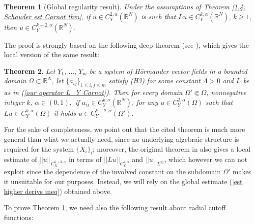 \documentclass{article}
\newtheorem{theorem}{Theorem}[section]
\numberwithin{equation}{section}
\begin{document}
\begin{theorem}[Global regularity result]
    \label{global regularity thm}
    Under the assumptions of Theorem \ref{1.4: Schauder est Carnot thm}, if $u \in C^{2,\alpha}_Y(\mathbb{R}^N)$ is such that $Lu \in C^{k,\alpha}_Y(\mathbb{R}^N), \, k \geq 1$, then $u \in C^{k+2,\alpha}_Y(\mathbb{R}^N)$.
\end{theorem}

\vspace{2mm}

\hspace{-7mm} The proof is strongly based on the following deep theorem (see \cite[Theorem 12.2.b]{librone}), which gives the local version of the same result:

\vspace{2mm}

\begin{theorem}
\label{local Hölder regularity thm}
    Let $Y_1, \, ..., \, Y_m$ be a system of Hörmander vector fields in a bounded domain $\Omega \subset \mathbb{R}^N$, let $\{a_{ij}\}_{1 \leq i,j \leq m}$ satisfy (H3)
    for some constant $\Lambda>0$ and $L$ be as in (\ref{our operator L_Y Carnot}). Then for every domain $\Omega' \Subset \Omega$, nonnegative integer $k$, $\alpha \in (0,1),$ if $ a_{ij} \in C^{k,\alpha}_Y(\mathbb{R}^N)$, for any $u \in C^{2,\alpha}_Y(\Omega)$ such that $Lu \in C^{k,\alpha}_Y(\Omega)$ it holds $u \in C^{k+2,\alpha}_Y(\Omega').$
\end{theorem}

\vspace{2mm}

\hspace{-7mm} For the sake of completeness, we point out that the cited theorem is much more general than what we actually need, since no underlying algebraic structure is required for the system $\{X_i\}_i$; moreover, the original theorem in \cite{librone} also gives a local estimate of $||u||_{C^{k+2,\alpha}_X}$ in terms of $||Lu||_{C^{k,\alpha}_Y}$ and $||u||_{L^{\infty}}$, which however we can not exploit since the dependence of the involved constant on the subdomain $\Omega'$ makes it unsuitable for our purposes. Instead, we will rely on the global estimate (\ref{est higher derivs ineq}) obtained above.

To prove Theorem \ref{global regularity thm}, we need also the following result about radial cutoff functions:

\vspace{2mm}
\end{document}
